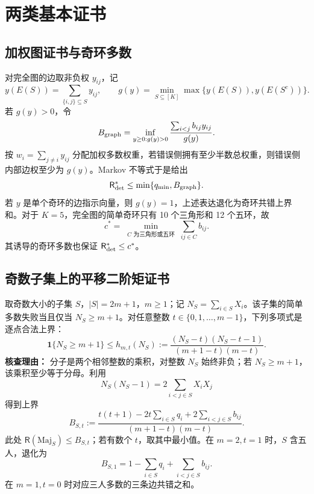 \documentclass[11pt,a4paper]{ctexart}
\theoremstyle{definition}
\newcommand{\Risk}{\mathsf R}
\newcommand{\I}{\mathbf 1}
\begin{document}
\section{两类基本证书}
\subsection{加权图证书与奇环多数}
对完全图的边取非负权 $y_{ij}$，记
\[
y(E(S))=\sum_{\{i,j\}\subseteq S}y_{ij},\qquad
g(y)=\min_{S\subseteq[K]}\max\{y(E(S)),y(E(S^c))\}.
\]
若 $g(y)>0$，令
\begin{equation}\label{eq:Bgraph}
B_{\rm graph}=\inf_{y\ge0:g(y)>0}\frac{\sum_{i<j}b_{ij}y_{ij}}{g(y)}.
\end{equation}
按 $w_i=\sum_{j\ne i}y_{ij}$ 分配加权多数权重，若错误侧拥有至少半数总权重，则错误侧内部边权至少为 $g(y)$。Markov 不等式于是给出
\begin{equation}\label{eq:graphbound}
\Risk_{\rm det}^*\le\min\{q_{\min},B_{\rm graph}\}.
\end{equation}
若 $y$ 是单个奇环的边指示向量，则 $g(y)=1$，上述表达退化为奇环共错上界和。对于 $K=5$，完全图的简单奇环只有 10 个三角形和 12 个五环，故
\[
c^*=\min_{\substack{C\text{ 为三角形或五环}}}\sum_{ij\in C}b_{ij}.
\]
其诱导的奇环多数也保证 $\Risk_{\rm det}^*\le c^*$。

\subsection{奇数子集上的平移二阶矩证书}
取奇数大小的子集 $S$，$|S|=2m+1$，$m\ge1$；记 $N_S=\sum_{i\in S}X_i$。该子集的简单多数失败当且仅当 $N_S\ge m+1$。对任意整数 $t\in\{0,1,\ldots,m-1\}$，下列多项式是逐点合法上界：
\begin{equation}\label{eq:translated}
\I\{N_S\ge m+1\}\le
h_{m,t}(N_S):=\frac{(N_S-t)(N_S-t-1)}{(m+1-t)(m-t)}.
\end{equation}
\textbf{核查理由：} 分子是两个相邻整数的乘积，对整数 $N_S$ 始终非负；若 $N_S\ge m+1$，该乘积至少等于分母。利用
\[
N_S(N_S-1)=2\sum_{i<j\in S}X_iX_j
\]
得到上界
\begin{equation}\label{eq:BPfamily}
\boxed{\ B_{S,t}:=
\frac{t(t+1)-2t\sum_{i\in S}q_i+2\sum_{i<j\in S}b_{ij}}
{(m+1-t)(m-t)}.\ }
\end{equation}
此处 $\Risk(\mathrm{Maj}_S)\le B_{S,t}$；若有数个 $t$，取其中最小值。在 $m=2,t=1$ 时，$S$ 含五人，退化为
\begin{equation}\label{eq:B5}
B_{S,1}=1-\sum_{i\in S}q_i+\sum_{i<j\in S}b_{ij}.
\end{equation}
在 $m=1,t=0$ 时对应三人多数的三条边共错之和。
\end{document}
